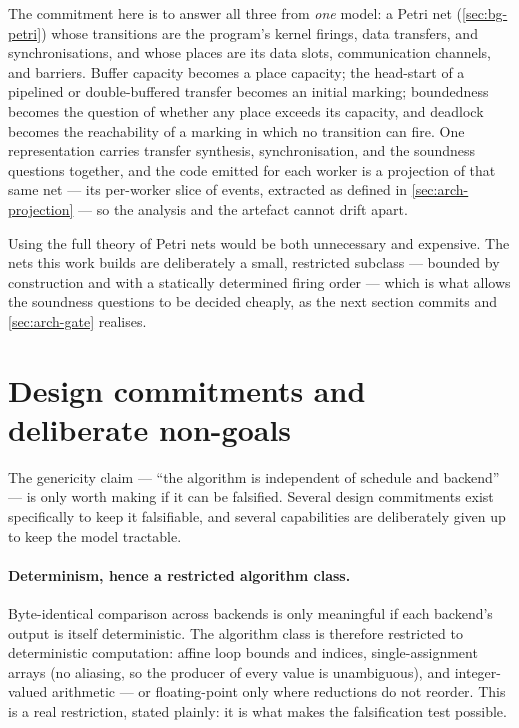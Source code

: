 The commitment here is to answer all three from \emph{one} model: a Petri net
(\cref{sec:bg-petri}) whose transitions are the program's kernel firings, data
transfers, and synchronisations, and whose places are its data slots,
communication channels, and barriers. Buffer capacity becomes a place capacity;
the head-start of a pipelined or double-buffered transfer becomes an initial
marking; boundedness becomes the question of whether any place exceeds its
capacity, and deadlock becomes the reachability of a marking in which no
transition can fire. One representation carries transfer synthesis,
synchronisation, and the soundness questions together, and the code emitted for
each worker is a projection of that same net --- its per-worker slice of events,
extracted as defined in \cref{sec:arch-projection} --- so the analysis and the
artefact cannot drift apart.

Using the full theory of Petri nets would be both unnecessary and expensive. The
nets this work builds are deliberately a small, restricted subclass --- bounded
by construction and with a statically determined firing order --- which is what
allows the soundness questions to be decided cheaply, as the next section commits
and \cref{sec:arch-gate} realises.

\section{Design commitments and deliberate non-goals}\label{sec:prob-commitments}

The genericity claim --- ``the algorithm is independent of schedule and
backend'' --- is only worth making if it can be falsified. Several design
commitments exist specifically to keep it falsifiable, and several capabilities
are deliberately given up to keep the model tractable.

\paragraph{Determinism, hence a restricted algorithm class.} Byte-identical
comparison across backends is only meaningful if each backend's output is itself
deterministic. The algorithm class is therefore restricted to deterministic
computation: affine loop bounds and indices, single-assignment arrays (no
aliasing, so the producer of every value is unambiguous), and integer-valued
arithmetic --- or floating-point only where reductions do not reorder. This is a
real restriction, stated plainly: it is what makes the falsification test
possible.

